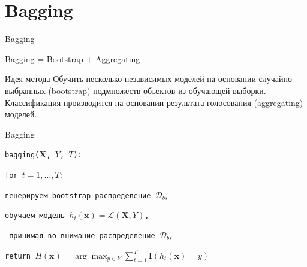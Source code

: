 \documentclass[10pt,a4paper]{beamer}
\begin{document}
\section{Bagging}


\begin{frame}{Bagging}

Bagging = Bootstrap + Aggregating

\vspace{1em}

\begin{block}{Идея метода}
Обучить несколько независимых моделей на основании случайно выбранных (bootstrap) подмножеств объектов из обучающей выборки. Классификация производится на основании результата голосования (aggregating) моделей.
\end{block}

\end{frame}


\begin{frame}{Bagging}

\texttt{bagging($\mathbf{X}$, $Y$, $T$):}

\texttt{\quad for $t = 1, \ldots, T$:}

\texttt{\quad\quad генерируем bootstrap-распределение $\mathcal{D}_{bs}$}

\texttt{\quad\quad обучаем модель $h_t(\mathbf{x}) = \mathcal{L}(\mathbf{X}, Y)$,}

\texttt{\quad\quad\; принимая во внимание распределение $\mathcal{D}_{bs}$}

\texttt{\quad return $H(\mathbf{x}) = \arg \max_{y \in Y} \sum_{t=1}^T \mathbf{I}(h_t(\mathbf{x}) = y)$}

\end{frame}

\end{document}
